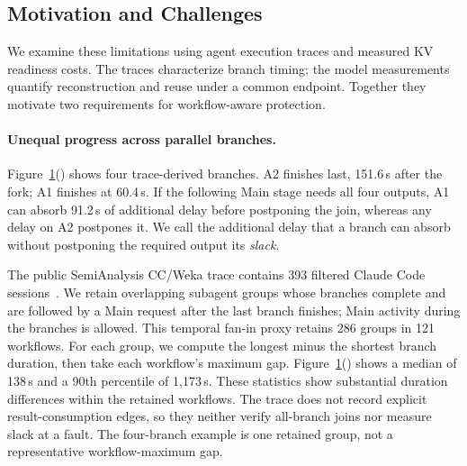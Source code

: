 \begin{figure}[t]
  \label{fig:motivation}
\end{figure}

\subsection{Motivation and Challenges}

We examine these limitations using agent execution traces and measured
KV readiness costs. The traces characterize branch timing; the model
measurements quantify reconstruction and reuse under a common endpoint.
Together they motivate two requirements for workflow-aware protection.

\paragraph{Unequal progress across parallel branches.}
\label{sec:motivation-workflow}
Figure~\ref{fig:motivation}() shows four
trace-derived branches. A2 finishes last, 151.6\,s after the fork;
A1 finishes at 60.4\,s. If the following Main stage needs all four outputs,
A1 can absorb 91.2\,s of additional delay before postponing the join,
whereas any delay on A2 postpones it. We call the additional delay that
a branch can absorb without postponing the required output its
\emph{slack}.

The public SemiAnalysis CC/Weka trace contains 393 filtered Claude Code
sessions~\cite{semianalysis2026cctraces}. We retain overlapping subagent
groups whose branches complete and are followed by a Main request after
the last branch finishes; Main activity during the branches is allowed.
This temporal fan-in proxy retains 286 groups in 121 workflows.
For each group, we compute the longest minus the shortest branch duration,
then take each workflow's maximum gap.
Figure~\ref{fig:motivation}() shows a
median of 138\,s and a 90th percentile of 1,173\,s. These statistics show
substantial duration differences within the retained workflows.
The trace does not record explicit result-consumption edges, so they
neither verify all-branch joins nor measure slack at a fault. The
four-branch example is one retained group, not a representative
workflow-maximum gap.

